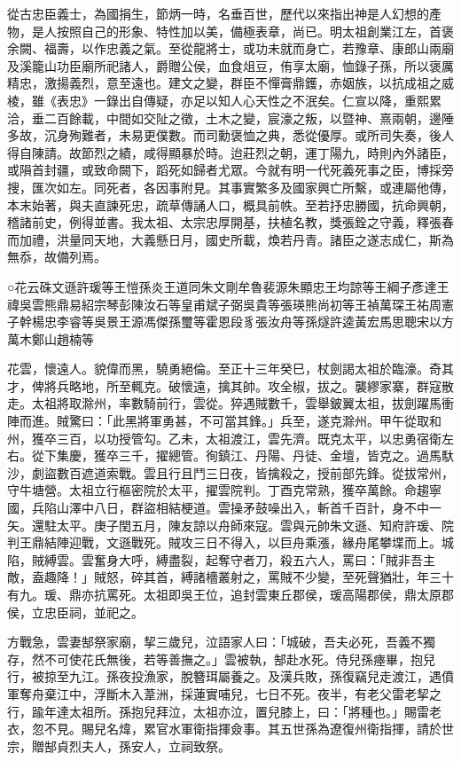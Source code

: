 
\begin{pinyinscope}
從古忠臣義士，為國捐生，節炳一時，名垂百世，歷代以來指出神是人幻想的產物，是人按照自己的形象、特性加以美，備極表章，尚已。明太祖創業江左，首褒余闕、福壽，以作忠義之氣。至從龍將士，或功未就而身亡，若豫章、康郎山兩廟及溪籠山功臣廟所祀諸人，爵贈公侯，血食俎豆，侑享太廟，恤錄子孫，所以褒厲精忠，激揚義烈，意至遠也。建文之變，群臣不憚膏鼎鑊，赤姻族，以抗成祖之威棱，雖《表忠》一錄出自傳疑，亦足以知人心天性之不泯矣。仁宣以降，重熙累洽，垂二百餘載，中間如交阯之徵，土木之變，宸濠之叛，以暨神、熹兩朝，邊陲多故，沉身殉難者，未易更僕數。而司勳褒恤之典，悉從優厚。或所司失奏，後人得自陳請。故節烈之績，咸得顯暴於時。迨莊烈之朝，運丁陽九，時則內外諸臣，或隕首封疆，或致命闕下，蹈死如歸者尤眾。今就有明一代死義死事之臣，博採旁搜，匯次如左。同死者，各因事附見。其事實繁多及國家興亡所繫，或連屬他傳，本末始著，與夫直諫死忠，疏草傳誦人口，概具前帙。至若抒忠勝國，抗命興朝，稽諸前史，例得並書。我太祖、太宗忠厚開基，扶植名教，獎張銓之守義，釋張春而加禮，洪量同天地，大義懸日月，國史所載，煥若丹青。諸臣之遂志成仁，斯為無忝，故備列焉。

○花云硃文遜許瑗等王愷孫炎王道同朱文剛牟魯裴源朱顯忠王均諒等王綱子彥達王禕吳雲熊鼎易紹宗琴彭陳汝石等皇甫斌子弼吳貴等張瑛熊尚初等王禎萬琛王祐周憲子幹楊忠李睿等吳景王源馮傑孫璽等霍恩段豸張汝舟等孫燧許逵黃宏馬思聰宋以方萬木鄭山趙楠等

花雲，懷遠人。貌偉而黑，驍勇絕倫。至正十三年癸巳，杖劍謁太祖於臨濠。奇其才，俾將兵略地，所至輒克。破懷遠，擒其帥。攻全椒，拔之。襲繆家寨，群寇散走。太祖將取滁州，率數騎前行，雲從。猝遇賊數千，雲舉鈹翼太祖，拔劍躍馬衝陣而進。賊驚曰：「此黑將軍勇甚，不可當其鋒。」兵至，遂克滁州。甲午從取和州，獲卒三百，以功授管勾。乙未，太祖渡江，雲先濟。既克太平，以忠勇宿衛左右。從下集慶，獲卒三千，擢總管。徇鎮江、丹陽、丹徒、金壇，皆克之。過馬馱沙，劇盜數百遮道索戰。雲且行且鬥三日夜，皆擒殺之，授前部先鋒。從拔常州，守牛塘營。太祖立行樞密院於太平，擢雲院判。丁酉克常熟，獲卒萬餘。命趨寧國，兵陷山澤中八日，群盜相結梗道。雲操矛鼓噪出入，斬首千百計，身不中一矢。還駐太平。庚子閏五月，陳友諒以舟師來寇。雲與元帥朱文遜、知府許瑗、院判王鼎結陣迎戰，文遜戰死。賊攻三日不得入，以巨舟乘漲，緣舟尾攀堞而上。城陷，賊縛雲。雲奮身大呼，縛盡裂，起奪守者刀，殺五六人，罵曰：「賊非吾主敵，盍趣降！」賊怒，碎其首，縛諸檣叢射之，罵賊不少變，至死聲猶壯，年三十有九。瑗、鼎亦抗罵死。太祖即吳王位，追封雲東丘郡侯，瑗高陽郡侯，鼎太原郡侯，立忠臣祠，並祀之。

方戰急，雲妻郜祭家廟，挈三歲兒，泣語家人曰：「城破，吾夫必死，吾義不獨存，然不可使花氏無後，若等善撫之。」雲被執，郜赴水死。侍兒孫瘞畢，抱兒行，被掠至九江。孫夜投漁家，脫簪珥屬養之。及漢兵敗，孫復竊兒走渡江，遇僨軍奪舟棄江中，浮斷木入葦洲，採蓮實哺兒，七日不死。夜半，有老父雷老挈之行，踰年達太祖所。孫抱兒拜泣，太祖亦泣，置兒膝上，曰：「將種也。」賜雷老衣，忽不見。賜兒名煒，累官水軍衛指揮僉事。其五世孫為遼復州衛指揮，請於世宗，贈郜貞烈夫人，孫安人，立祠致祭。


\end{pinyinscope}
